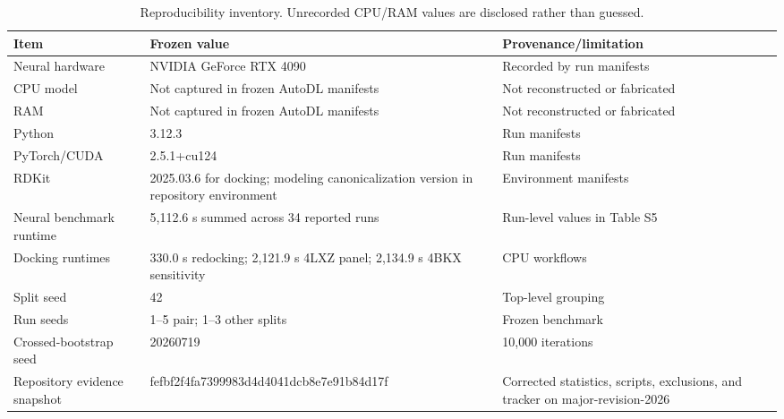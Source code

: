 \begingroup
\footnotesize
\begin{table}[H]
\centering
\caption{Reproducibility inventory. Unrecorded CPU/RAM values are disclosed rather than guessed.}
\label{tab:s_repro}
\begin{tabular}{@{}p{}p{}p{}@{}}
\toprule
Item & Frozen value & Provenance/limitation \\
\midrule
Neural hardware & NVIDIA GeForce RTX 4090 & Recorded by run manifests \\
CPU model & Not captured in frozen AutoDL manifests & Not reconstructed or fabricated \\
RAM & Not captured in frozen AutoDL manifests & Not reconstructed or fabricated \\
Python & 3.12.3 & Run manifests \\
PyTorch/CUDA & 2.5.1+cu124 & Run manifests \\
RDKit & 2025.03.6 for docking; modeling canonicalization version in repository environment & Environment manifests \\
Neural benchmark runtime & 5,112.6 s summed across 34 reported runs & Run-level values in Table S5 \\
Docking runtimes & 330.0 s redocking; 2,121.9 s 4LXZ panel; 2,134.9 s 4BKX sensitivity & CPU workflows \\
Split seed & 42 & Top-level grouping \\
Run seeds & 1--5 pair; 1--3 other splits & Frozen benchmark \\
Crossed-bootstrap seed & 20260719 & 10,000 iterations \\
Repository evidence snapshot & fefbf2f4fa7399983d4d4041dcb8e7e91b84d17f & Corrected statistics, scripts, exclusions, and tracker on major-revision-2026 \\
\bottomrule
\end{tabular}
\end{table}
\endgroup
